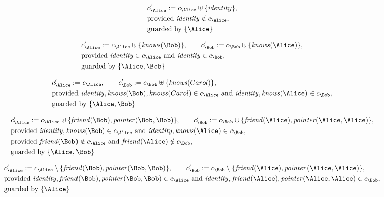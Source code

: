 \begin{align*}
&
c'_
{
\Alice
}
 := 
c_
{
\Alice
}
 \uplus 
\{
\mathit{
identity
}
\}
,\\
&
\text{provided } 
\mathit{
identity
}
 \notin c_
{
\Alice
}
,\\
&
\text{guarded by } \{
\Alice
\}
\end{align*}

\begin{align*}
&
c'_
{
\Alice
}
 := 
c_
{
\Alice
}
 \uplus 
\{
\mathit{
knows
}
(
\Bob
)
\}
, \qquad 
c'_
{
\Bob
}
 := 
c_
{
\Bob
}
 \uplus 
\{
\mathit{
knows
}
(
\Alice
)
\}
,\\
&
\text{provided } 
\mathit{
identity
}
 \in c_
{
\Alice
}
 \text{ and } 
\mathit{
identity
}
 \in c_
{
\Bob
}
,\\
&
\text{guarded by } \{
\Alice
,
\Bob
\}
\end{align*}

\begin{align*}
&
c'_
{
\Alice
}
 := 
c_
{
\Alice
}
, \qquad 
c'_
{
\Bob
}
 := 
c_
{
\Bob
}
 \uplus 
\{
\mathit{
knows
}
(
Carol
)
\}
,\\
&
\text{provided } 
\mathit{
identity
}
,
\mathit{
knows
}
(
\Bob
)
,
\mathit{
knows
}
(
Carol
)
 \in c_
{
\Alice
}
 \text{ and } 
\mathit{
identity
}
,
\mathit{
knows
}
(
\Alice
)
 \in c_
{
\Bob
}
,\\
&
\text{guarded by } \{
\Alice
,
\Bob
\}
\end{align*}

\begin{align*}
&
c'_
{
\Alice
}
 := 
c_
{
\Alice
}
 \uplus 
\{
\mathit{
friend
}
(
\Bob
)
,
\mathit{
pointer
}
(
\Bob
,
\Bob
)
\}
, \qquad 
c'_
{
\Bob
}
 := 
c_
{
\Bob
}
 \uplus 
\{
\mathit{
friend
}
(
\Alice
)
,
\mathit{
pointer
}
(
\Alice
,
\Alice
)
\}
,\\
&
\text{provided } 
\mathit{
identity
}
,
\mathit{
knows
}
(
\Bob
)
 \in c_
{
\Alice
}
 \text{ and } 
\mathit{
identity
}
,
\mathit{
knows
}
(
\Alice
)
 \in c_
{
\Bob
}
,\\
&
\text{provided } 
\mathit{
friend
}
(
\Bob
)
 \notin c_
{
\Alice
}
 \text{ and } 
\mathit{
friend
}
(
\Alice
)
 \notin c_
{
\Bob
}
,\\
&
\text{guarded by } \{
\Alice
,
\Bob
\}
\end{align*}

\begin{align*}
&
c'_
{
\Alice
}
 := 
c_
{
\Alice
}
 \setminus 
\{
\mathit{
friend
}
(
\Bob
)
,
\mathit{
pointer
}
(
\Bob
,
\Bob
)
\}
, \qquad 
c'_
{
\Bob
}
 := 
c_
{
\Bob
}
 \setminus 
\{
\mathit{
friend
}
(
\Alice
)
,
\mathit{
pointer
}
(
\Alice
,
\Alice
)
\}
,\\
&
\text{provided } 
\mathit{
identity
}
,
\mathit{
friend
}
(
\Bob
)
,
\mathit{
pointer
}
(
\Bob
,
\Bob
)
 \in c_
{
\Alice
}
 \text{ and } 
\mathit{
identity
}
,
\mathit{
friend
}
(
\Alice
)
,
\mathit{
pointer
}
(
\Alice
,
\Alice
)
 \in c_
{
\Bob
}
,\\
&
\text{guarded by } \{
\Alice
\}
\end{align*}
